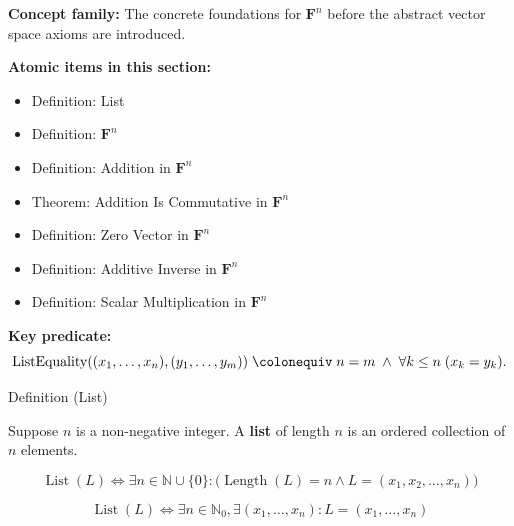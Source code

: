 
\begin{remark*}
\textbf{Concept family:} The concrete foundations for $\mathbf{F}^n$ before the
abstract vector space axioms are introduced.

\medskip
\textbf{Atomic items in this section:}
\begin{itemize}
  \item Definition: List
  \item Definition: $\mathbf{F}^n$
  \item Definition: Addition in $\mathbf{F}^n$
  \item Theorem: Addition Is Commutative in $\mathbf{F}^n$
  \item Definition: Zero Vector in $\mathbf{F}^n$
  \item Definition: Additive Inverse in $\mathbf{F}^n$
  \item Definition: Scalar Multiplication in $\mathbf{F}^n$
\end{itemize}

\medskip
\textbf{Key predicate:}
\[
  \operatorname{ListEquality}((x_1,\ldots,x_n),(y_1,\ldots,y_m))
  \;\colonequiv\;
  n = m \;\wedge\; \forall k \le n\;(x_k = y_k).
\]
\end{remark*}


\begin{definitionbox}{Definition (List)}
\begin{definition}[List]
\label{def:list}
Suppose $n$ is a non-negative integer. A \textbf{list} of length $n$ is an ordered collection of $n$ elements.
\end{definition}
\end{definitionbox}

\begin{remark*}
\[
\operatorname{List}(L) \iff \exists n \in \mathbb{N} \cup \{0\} : \bigl( \operatorname{Length}(L) = n \land L = (x_1, x_2, \dots, x_n) \bigr)
\]
\end{remark*}

\begin{remark*}
\[
\operatorname{List}(L) \iff \exists n \in \mathbb{N}_0, \exists (x_1, \dots, x_n) : L = (x_1, \dots, x_n)
\]
\end{remark*}

